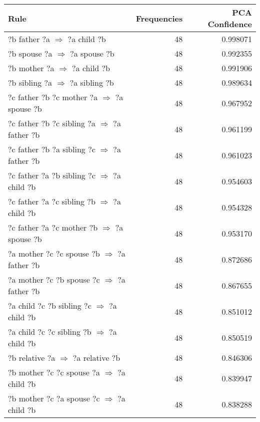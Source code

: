 \newpage
\begin{longtable}{lrr}
\toprule
                                                    Rule &  Frequencies &  PCA Confidence \\
\midrule
                       ?b  father  ?a   $\Rightarrow$ ?a  child  ?b &           48 &        0.998071 \\
                      ?b  spouse  ?a   $\Rightarrow$ ?a  spouse  ?b &           48 &        0.992355 \\
                       ?b  mother  ?a   $\Rightarrow$ ?a  child  ?b &           48 &        0.991906 \\
                    ?b  sibling  ?a   $\Rightarrow$ ?a  sibling  ?b &           48 &        0.989634 \\
      ?c  father  ?b  ?c  mother  ?a   $\Rightarrow$ ?a  spouse  ?b &           48 &        0.967952 \\
     ?c  father  ?b  ?c  sibling  ?a   $\Rightarrow$ ?a  father  ?b &           48 &        0.961199 \\
     ?c  father  ?b  ?a  sibling  ?c   $\Rightarrow$ ?a  father  ?b &           48 &        0.961023 \\
      ?c  father  ?a  ?b  sibling  ?c   $\Rightarrow$ ?a  child  ?b &           48 &        0.954603 \\
      ?c  father  ?a  ?c  sibling  ?b   $\Rightarrow$ ?a  child  ?b &           48 &        0.954328 \\
      ?c  father  ?a  ?c  mother  ?b   $\Rightarrow$ ?a  spouse  ?b &           48 &        0.953170 \\
      ?a  mother  ?c  ?c  spouse  ?b   $\Rightarrow$ ?a  father  ?b &           48 &        0.872686 \\
      ?a  mother  ?c  ?b  spouse  ?c   $\Rightarrow$ ?a  father  ?b &           48 &        0.867655 \\
       ?a  child  ?c  ?b  sibling  ?c   $\Rightarrow$ ?a  child  ?b &           48 &        0.851012 \\
       ?a  child  ?c  ?c  sibling  ?b   $\Rightarrow$ ?a  child  ?b &           48 &        0.850519 \\
                  ?b  relative  ?a   $\Rightarrow$ ?a  relative  ?b &           48 &        0.846306 \\
       ?b  mother  ?c  ?c  spouse  ?a   $\Rightarrow$ ?a  child  ?b &           48 &        0.839947 \\
       ?b  mother  ?c  ?a  spouse  ?c   $\Rightarrow$ ?a  child  ?b &           48 &        0.838288 \\

\end{longtable}

